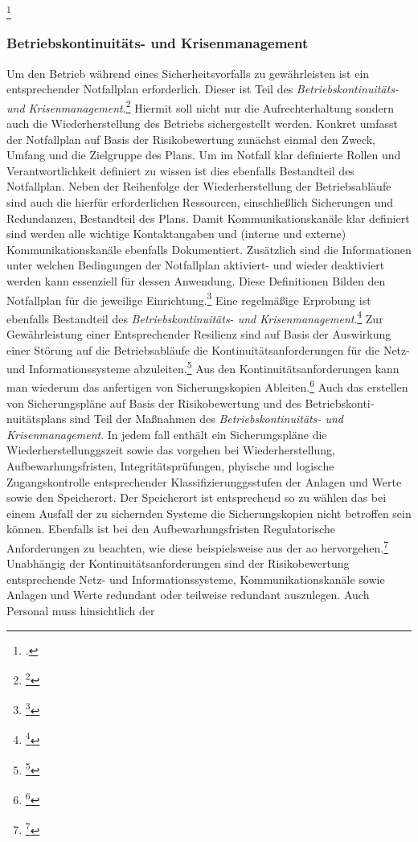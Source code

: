 \documentclass[11pt,a4paper,hidelinks]{article}   %
\begin{document}
{                \footcite[Vgl.][, Artikel 4]{EU2024-2690}
            }

            \subsubsection{Betriebskontinuitäts- und Krisenmanagement}
            Um den Betrieb während eines Sicherheitsvorfalls zu gewährleisten ist ein entsprechender Notfallplan erforderlich. Dieser ist Teil des \emph{Betriebskontinuitäts- und Krisenmanagement}.\footnote{\footcite[Vgl.][, Anhang, Nummer 4.1.1.]{EU2024-2690}} Hiermit soll nicht nur die Aufrechterhaltung sondern auch die Wiederherstellung des Betriebs sichergestellt werden. Konkret umfasst der Notfallplan auf Basis der Risikobewertung zunächst einmal den Zweck, Umfang und die Zielgruppe des Plans. Um im Notfall klar definierte Rollen und Verantwortlichkeit definiert zu wissen ist dies ebenfalls Bestandteil des Notfallplan. Neben der Reihenfolge der Wiederherstellung der Betriebsabläufe sind auch die hierfür erforderlichen Ressourcen, einschließlich Sicherungen und Redundanzen, Bestandteil des Plans. Damit Kommunikationskanäle klar definiert sind werden alle wichtige Kontaktangaben und (interne und externe) Kommunikationskanäle ebenfalls Dokumentiert. Zusätzlich sind die Informationen unter welchen Bedingungen der Notfallplan aktiviert- und wieder deaktiviert werden kann essenziell für dessen Anwendung. Diese Definitionen Bilden den Notfallplan für die jeweilige Einrichtung.\footnote{\footcite[Vgl.][, Anhang, Nummer 4.1.2.]{EU2024-2690}} Eine regelmäßige Erprobung ist ebenfalls Bestandteil des \emph{Betriebskontinuitäts- und Krisenmanagement}.\footnote{\footcite[Vgl.][, Anhang, Nummer 4.1.4.]{EU2024-2690}} Zur Gewährleistung einer Entsprechender Resilienz sind auf Basis der Auswirkung einer Störung auf die Betriebsabläufe die Kontinuitätsanforderungen für die Netz- und Informationssysteme abzuleiten.\footnote{\footcite[Vgl.][, Anhang, Nummer 4.1.3. \& 4.2.2.]{EU2024-2690}} Aus den Kontinuitätsanforderungen kann man wiederum das anfertigen von Sicherungskopien Ableiten.\footnote{\footcite[Vgl.][, Anhang, Nummer 4.2.1.]{EU2024-2690}} Auch das erstellen von Sicherungspläne auf Basis der Risikobewertung und des Betriebskonti­nuitätsplans sind Teil der Maßnahmen des \emph{Betriebskontinuitäts- und Krisenmanagement}. In jedem fall enthält ein Sicherungspläne die Wiederherstellunggszeit sowie das vorgehen bei Wiederherstellung, Aufbewarhungsfristen, Integritätsprüfungen, phyische und logische Zugangskontrolle entsprechender Klassifizierunggsstufen der Anlagen und Werte sowie den Speicherort. Der Speicherort ist entsprechend so zu wählen das bei einem Ausfall der zu sichernden Systeme die Sicherungskopien nicht betroffen sein können. Ebenfalls ist bei den Aufbewarhungsfristen Regulatorische Anforderungen zu beachten, wie diese beispielsweise aus der \gls{ao} hervorgehen.\footnote{\footcite[Vgl.][, Anhang, Nummer 4.2.2.]{EU2024-2690}} Unabhängig der Kontinuitätsanforderungen sind der Risikobewertung entsprechende Netz- und Informationssysteme, Kommunikationskanäle sowie Anlagen und Werte redundant oder teilweise redundant auszulegen. Auch Personal muss hinsichtlich der 
\end{document}
